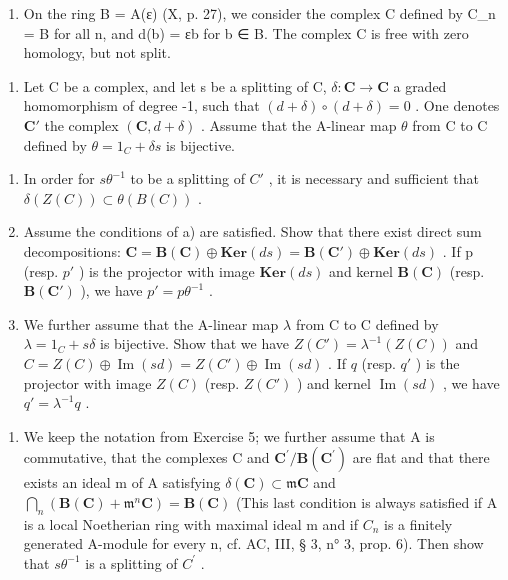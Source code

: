 \begin{enumerate}
\def\labelenumi{\alph{enumi})}
\setcounter{enumi}{1}
\tightlist
\item
  On the ring B = A(ε) (X, p. 27), we consider the complex C defined by C\_n = B for all n, and d(b) = εb for b ∈ B. The complex C is free with zero homology, but not split.
\end{enumerate}

\begin{enumerate}
\def\labelenumi{\arabic{enumi})}
\setcounter{enumi}{4}
\tightlist
\item
  Let C be a complex, and let s be a splitting of C, \(\delta: \mathbf{C} \to \mathbf{C}\) a graded homomorphism of degree -1, such that \((d + \delta) \circ (d + \delta) = 0\) . One denotes \(\mathbf{C}'\) the complex \((\mathbf{C}, d + \delta)\) . Assume that the A-linear map \(\theta\) from C to C defined by \(\theta = 1_C + \delta s\) is bijective.
\end{enumerate}

\begin{enumerate}
\def\labelenumi{\alph{enumi})}
\item
  In order for \(s\theta^{-1}\) to be a splitting of \(C'\) , it is necessary and sufficient that \(\delta(Z(C)) \subset \theta(B(C))\) .
\item
  Assume the conditions of a) are satisfied. Show that there exist direct sum decompositions: \(\mathbf{C} = \mathbf{B}(\mathbf{C}) \oplus \mathbf{Ker}(ds) = \mathbf{B}(\mathbf{C}') \oplus \mathbf{Ker}(ds)\) . If p (resp. \(p'\) ) is the projector with image \(\mathbf{Ker}(ds)\) and kernel \(\mathbf{B}(\mathbf{C})\) (resp. \(\mathbf{B}(\mathbf{C}')\) ), we have \(p' = p\theta^{-1}\) .
\item
  We further assume that the A-linear map \(\lambda\) from C to C defined by \(\lambda = 1_{C} + s\delta\) is bijective. Show that we have \(Z(C') = \lambda^{-1}(Z(C))\) and \(C = Z(C) \oplus \operatorname{Im}(sd) = Z(C') \oplus \operatorname{Im}(sd)\) . If \(q\) (resp. \(q'\) ) is the projector with image \(Z(C)\) (resp. \(Z(C')\) ) and kernel \(\operatorname{Im}(sd)\) , we have \(q' = \lambda^{-1} q\) .
\end{enumerate}

\begin{enumerate}
\def\labelenumi{\arabic{enumi})}
\setcounter{enumi}{5}
\tightlist
\item
  We keep the notation from Exercise 5; we further assume that A is commutative, that the complexes C and \(\mathbf{C}^{\prime}/\mathbf{B}(\mathbf{C}^{\prime})\) are flat and that there exists an ideal m of A satisfying \(\delta(\mathbf{C}) \subset \mathfrak{m}\mathbf{C}\) and \(\bigcap_{n} (\mathbf{B}(\mathbf{C}) + \mathfrak{m}^{n}\mathbf{C}) = \mathbf{B}(\mathbf{C})\) (This last condition is always satisfied if A is a local Noetherian ring with maximal ideal m and if \(C_{n}\) is a finitely generated A-module for every n, cf. AC, III, § 3, n° 3, prop. 6). Then show that \(s\theta^{-1}\) is a splitting of \(C^{\prime}\) .
\end{enumerate}


